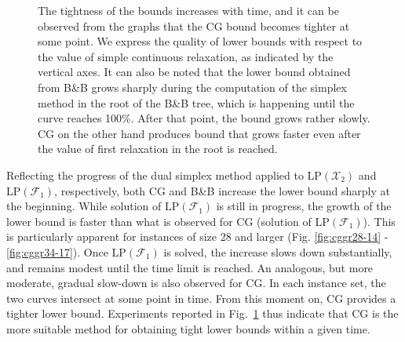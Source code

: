 \begin{figure}[!htb]
{{	The tightness of the bounds increases with time, and it can be observed from the graphs that the CG bound becomes tighter at some point.
	We express the quality of lower bounds with respect to the value of simple continuous relaxation, as indicated by the vertical axes.
	It can also be noted that the lower bound obtained from B\&B grows sharply during the computation of the simplex method in the root of the B\&B tree, 
	which is happening until the curve reaches 100\%.
	After that point, the bound grows rather slowly.
	CG on the other hand produces bound that grows faster even after the value of first relaxation in the root is reached.
	}}
  \label{fig:cggr}
\end{figure} 

Reflecting the progress of the dual simplex method applied to $\text{LP}(\mathcal{X}_2)$ and $\text{LP}(\mathcal{F}_1)$, respectively,
both CG and B\&B increase the lower bound sharply at the beginning. 
While solution of $\text{LP}(\mathcal{F}_1)$ is still in progress, the growth of the lower bound is faster than what is observed for CG (solution of $\text{LP}(\mathcal{F}_1)$). 
This is particularly apparent for instances of size 28 and larger (Fig. \ref{fig:cggr28-14} - \ref{fig:cggr34-17}). %
Once $\text{LP}(\mathcal{F}_1)$ is solved, the increase slows down substantially, and remains modest until the time limit is reached. 
An analogous, but more moderate, gradual slow-down is also observed for CG.
In each instance set, the two curves intersect at some point in time.
From this moment on, CG provides a tighter lower bound.
Experiments reported in Fig.\ \ref{fig:cggr} thus indicate that CG is the more suitable method for obtaining tight lower bounds within a given time.
